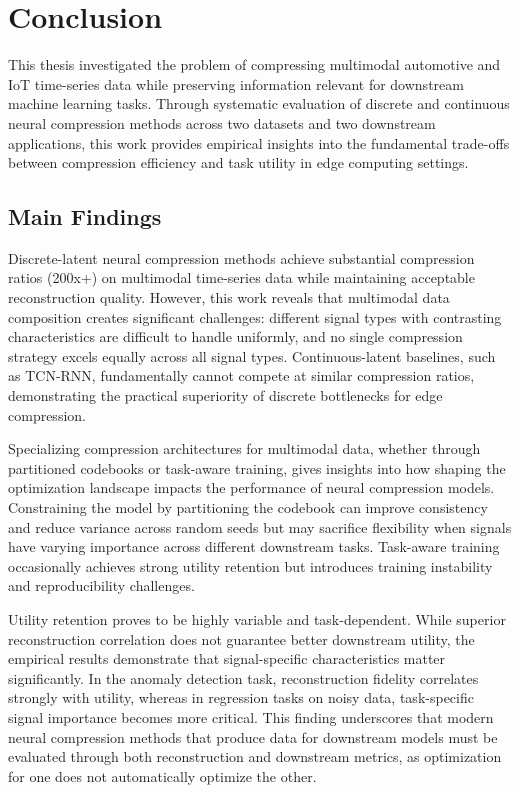 \chapter{Conclusion}

This thesis investigated the problem of compressing multimodal automotive and IoT time-series data while preserving information relevant for downstream machine learning tasks. Through systematic evaluation of discrete and continuous neural compression methods across two datasets and two downstream applications, this work provides empirical insights into the fundamental trade-offs between compression efficiency and task utility in edge computing settings.

\section{Main Findings}

Discrete-latent neural compression methods achieve substantial compression ratios (200x+) on multimodal time-series data while maintaining acceptable reconstruction quality. However, this work reveals that multimodal data composition creates significant challenges: different signal types with contrasting characteristics are difficult to handle uniformly, and no single compression strategy excels equally across all signal types. Continuous-latent baselines, such as TCN-RNN, fundamentally cannot compete at similar compression ratios, demonstrating the practical superiority of discrete bottlenecks for edge compression.

Specializing compression architectures for multimodal data, whether through partitioned codebooks or task-aware training, gives insights into how shaping the optimization landscape impacts the performance of neural compression models. Constraining the model by partitioning the codebook can improve consistency and reduce variance across random seeds but may sacrifice flexibility when signals have varying importance across different downstream tasks. Task-aware training occasionally achieves strong utility retention but introduces training instability and reproducibility challenges. 

Utility retention proves to be highly variable and task-dependent. While superior reconstruction correlation does not guarantee better downstream utility, the empirical results demonstrate that signal-specific characteristics matter significantly. In the anomaly detection task, reconstruction fidelity correlates strongly with utility, whereas in regression tasks on noisy data, task-specific signal importance becomes more critical. This finding underscores that modern neural compression methods that produce data for downstream models must be evaluated through both reconstruction and downstream metrics, as optimization for one does not automatically optimize the other.

